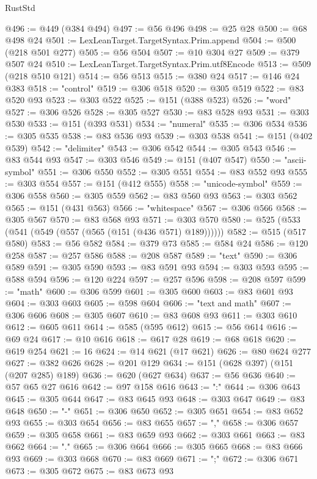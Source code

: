 \begin{lexlean}{RustStd}
\begin{coremodule}
@496 := @449 (@384 @494)
@497 := @56 @496
@498 := @25 @28
@500 := @68 @498 @24
@501 := LexLeanTarget.TargetSyntax.Prim.append
@504 := @500 (@218 @501 @277)
@505 := @56 @504
@507 := @10 @304 @27
@509 := @379 @507 @24
@510 := LexLeanTarget.TargetSyntax.Prim.utf8Encode
@513 := @509 (@218 @510 @121)
@514 := @56 @513
@515 := @380 @24
@517 := @146 @24 @383
@518 := "control"
@519 := @306 @518
@520 := @305 @519
@522 := @83 @520 @93
@523 := @303 @522
@525 := @151 (@388 @523)
@526 := "word"
@527 := @306 @526
@528 := @305 @527
@530 := @83 @528 @93
@531 := @303 @530
@533 := @151 (@393 @531)
@534 := "numeral"
@535 := @306 @534
@536 := @305 @535
@538 := @83 @536 @93
@539 := @303 @538
@541 := @151 (@402 @539)
@542 := "delimiter"
@543 := @306 @542
@544 := @305 @543
@546 := @83 @544 @93
@547 := @303 @546
@549 := @151 (@407 @547)
@550 := "ascii-symbol"
@551 := @306 @550
@552 := @305 @551
@554 := @83 @552 @93
@555 := @303 @554
@557 := @151 (@412 @555)
@558 := "unicode-symbol"
@559 := @306 @558
@560 := @305 @559
@562 := @83 @560 @93
@563 := @303 @562
@565 := @151 (@431 @563)
@566 := "whitespace"
@567 := @306 @566
@568 := @305 @567
@570 := @83 @568 @93
@571 := @303 @570
@580 := @525 (@533 (@541 (@549 (@557 (@565 (@151 (@436 @571) @189))))))
@582 := @515 (@517 @580)
@583 := @56 @582
@584 := @379 @73
@585 := @584 @24
@586 := @120 @258
@587 := @257 @586
@588 := @208 @587
@589 := "text"
@590 := @306 @589
@591 := @305 @590
@593 := @83 @591 @93
@594 := @303 @593
@595 := @588 @594
@596 := @120 @224
@597 := @257 @596
@598 := @208 @597
@599 := "math"
@600 := @306 @599
@601 := @305 @600
@603 := @83 @601 @93
@604 := @303 @603
@605 := @598 @604
@606 := "text and math"
@607 := @306 @606
@608 := @305 @607
@610 := @83 @608 @93
@611 := @303 @610
@612 := @605 @611
@614 := @585 (@595 @612)
@615 := @56 @614
@616 := @69 @24
@617 := @10 @616
@618 := @617 @28
@619 := @68 @618
@620 := @619 @254
@621 := 16
@624 := @14 @621 (@17 @621)
@626 := @80 @624 @277
@627 := @382 @626
@628 := @201 @129
@634 := @151 (@628 @397) (@151 (@207 @285) @189)
@636 := @620 (@627 @634)
@637 := @56 @636
@640 := @57 @65 @27 @616
@642 := @97 @158 @616
@643 := ":"
@644 := @306 @643
@645 := @305 @644
@647 := @83 @645 @93
@648 := @303 @647
@649 := @83 @648
@650 := "-"
@651 := @306 @650
@652 := @305 @651
@654 := @83 @652 @93
@655 := @303 @654
@656 := @83 @655
@657 := ","
@658 := @306 @657
@659 := @305 @658
@661 := @83 @659 @93
@662 := @303 @661
@663 := @83 @662
@664 := "."
@665 := @306 @664
@666 := @305 @665
@668 := @83 @666 @93
@669 := @303 @668
@670 := @83 @669
@671 := ";"
@672 := @306 @671
@673 := @305 @672
@675 := @83 @673 @93

\end{coremodule}
\end{lexlean}
